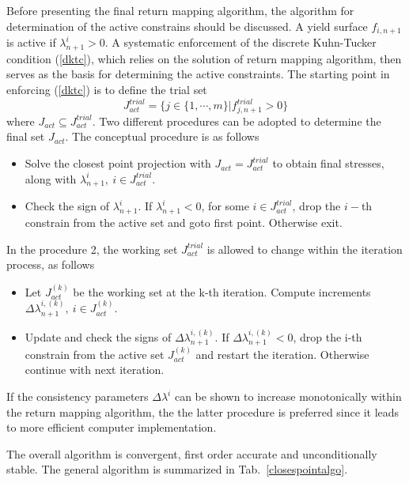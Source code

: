 \documentclass[a4paper]{article}
\begin{document}
Before presenting the final return mapping algorithm, the algorithm for determination of the active constrains should be discussed. A yield surface $f_{i,n+1}$ is active if $\lambda^i_{n+1} > 0$. A systematic enforcement of the discrete Kuhn-Tucker condition (\ref{dktc}), which relies on the solution of return mapping algorithm, then serves as the basis for determining the active constraints. The starting point in enforcing (\ref{dktc}) is to define the trial set
\begin{equation}
  J^{trial}_{act}=\{j\in\{1,\cdots,m\}|f^{trial}_{j,n+1} > 0\}
\end{equation}
where $J_{act}\subseteq J_{act}^{trial}$. Two different procedures can be adopted to determine the final set $J_{act}$. The conceptual procedure is as follows
\begin{itemize}
 \item
 Solve the closest point projection with $J_{act}=J_{act}^{trial}$ to obtain final stresses, along with $\lambda^i_{n+1},\ i\in J_{act}^{trial}$.
\item
Check the sign of $\lambda^i_{n+1}$. If $\lambda^i_{n+1} <0$, for some $i\in J_{act}^{trial}$, drop the $i-$th constrain from the active set and goto first point. Otherwise exit.
\end{itemize}

In the procedure 2, the working set $J_{act}^{trial}$ is allowed to change within the iteration process, as follows
\begin{itemize}
\item
Let $J_{act}^{(k)}$ be the working set at the k-th iteration. Compute increments $\Delta\lambda^{i,(k)}_{n+1},\ i\in J_{act}^{(k)}$.
\item
Update and check the signs of $\Delta\lambda^{i,(k)}_{n+1}$. If $\Delta\lambda^{i,(k)}_{n+1} < 0$, drop the i-th constrain from the active set $J_{act}^{(k)}$ and restart the iteration. Otherwise continue with next iteration.
\end{itemize}
If the consistency parameters $\Delta\lambda^{i}$ can be shown to increase monotonically within the return mapping algorithm, the the latter procedure is preferred since it leads to more efficient computer implementation.

The overall algorithm is convergent, first order accurate and unconditionally stable.
The general algorithm is summarized in Tab.~\ref{closespointalgo}.
\end{document}
